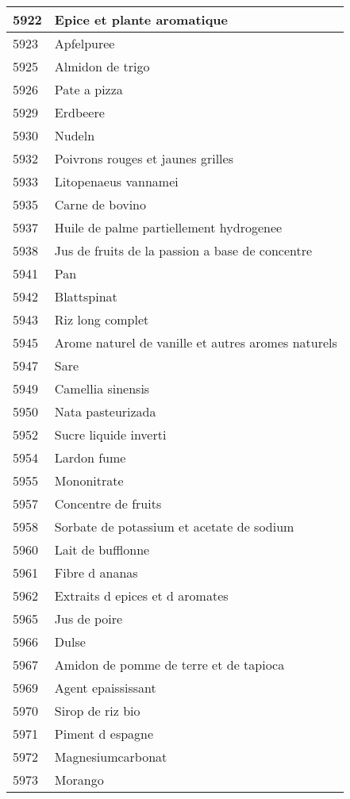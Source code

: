 \begin{longtable}{|l|l|}
5922 & Epice et plante aromatique \\ \hline 
5923 & Apfelpuree \\ \hline 
5925 & Almidon de trigo \\ \hline 
5926 & Pate a pizza \\ \hline 
5929 & Erdbeere \\ \hline 
5930 & Nudeln \\ \hline 
5932 & Poivrons rouges et jaunes grilles \\ \hline 
5933 & Litopenaeus vannamei \\ \hline 
5935 & Carne de bovino \\ \hline 
5937 & Huile de palme partiellement hydrogenee \\ \hline 
5938 & Jus de fruits de la passion a base de concentre \\ \hline 
5941 & Pan \\ \hline 
5942 & Blattspinat \\ \hline 
5943 & Riz long complet \\ \hline 
5945 & Arome naturel de vanille et autres aromes naturels \\ \hline 
5947 & Sare \\ \hline 
5949 & Camellia sinensis \\ \hline 
5950 & Nata pasteurizada \\ \hline 
5952 & Sucre liquide inverti \\ \hline 
5954 & Lardon fume \\ \hline 
5955 & Mononitrate \\ \hline 
5957 & Concentre de fruits \\ \hline 
5958 & Sorbate de potassium et acetate de sodium \\ \hline 
5960 & Lait de bufflonne \\ \hline 
5961 & Fibre d ananas \\ \hline 
5962 & Extraits d epices et d aromates \\ \hline 
5965 & Jus de poire \\ \hline 
5966 & Dulse \\ \hline 
5967 & Amidon de pomme de terre et de tapioca \\ \hline 
5969 & Agent epaississant \\ \hline 
5970 & Sirop de riz bio \\ \hline 
5971 & Piment d espagne \\ \hline 
5972 & Magnesiumcarbonat \\ \hline 
5973 & Morango \\ \hline 

\end{longtable}
